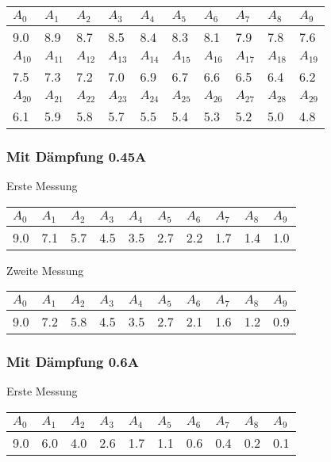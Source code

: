\documentclass[12pt,a4paper]{article}
\begin{document}
\vspace{3pt}
\begin{tabular}{|l|l|l|l|l|l|l|l|l|l|}
\hline
$A_{0}$&$A_{1}$&$A_{2}$&$A_{3}$&$A_{4}$&$A_{5}$&$A_{6}$&$A_{7}$&$A_{8}$&$A_{9}$\\
\hline
9.0&8.9&8.7&8.5&8.4&8.3&8.1&7.9&7.8&7.6\\
\hline
\hline
$A_{10}$&$A_{11}$&$A_{12}$&$A_{13}$&$A_{14}$&$A_{15}$&$A_{16}$&$A_{17}$&$A_{18}$&$A_{19}$\\
\hline
7.5&7.3&7.2&7.0&6.9&6.7&6.6&6.5&6.4&6.2\\
\hline
\hline
$A_{20}$&$A_{21}$&$A_{22}$&$A_{23}$&$A_{24}$&$A_{25}$&$A_{26}$&$A_{27}$&$A_{28}$&$A_{29}$\\
\hline
6.1&5.9&5.8&5.7&5.5&5.4&5.3&5.2&5.0&4.8\\
\hline
\end{tabular}

\subsubsection*{Mit D\"ampfung 0.45A}
Erste Messung

\vspace{3pt}
\begin{tabular}{|l|l|l|l|l|l|l|l|l|l|}
\hline
$A_{0}$&$A_{1}$&$A_{2}$&$A_{3}$&$A_{4}$&$A_{5}$&$A_{6}$&$A_{7}$&$A_{8}$&$A_{9}$\\
\hline
9.0&7.1&5.7&4.5&3.5&2.7&2.2&1.7&1.4&1.0\\
\hline
\end{tabular}
\vspace{10pt}

Zweite Messung

\vspace{3pt}
\begin{tabular}{|l|l|l|l|l|l|l|l|l|l|}
\hline
$A_{0}$&$A_{1}$&$A_{2}$&$A_{3}$&$A_{4}$&$A_{5}$&$A_{6}$&$A_{7}$&$A_{8}$&$A_{9}$\\
\hline
9.0&7.2&5.8&4.5&3.5&2.7&2.1&1.6&1.2&0.9\\
\hline
\end{tabular}

\subsubsection*{Mit D\"ampfung 0.6A}
Erste Messung

\begin{tabular}{|l|l|l|l|l|l|l|l|l|l|}
\hline
$A_{0}$&$A_{1}$&$A_{2}$&$A_{3}$&$A_{4}$&$A_{5}$&$A_{6}$&$A_{7}$&$A_{8}$&$A_{9}$\\
\hline
9.0&6.0&4.0&2.6&1.7&1.1&0.6&0.4&0.2&0.1\\
\hline
\end{tabular}
\vspace{10pt}
\end{document}
